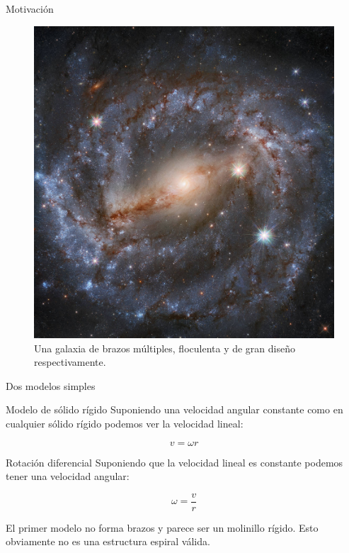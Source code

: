 \documentclass{beamer}
\begin{document}
\begin{frame}{Motivación}
\begin{figure}[h!]
\begin{center}
     \includegraphics[scale=0.04]{granDiseno.jpg}
     \caption{Una galaxia de brazos múltiples, floculenta y de gran diseño respectivamente.}
     \end{center}
\end{figure}
\end{frame}

\begin{frame}{Dos modelos simples}

 \begin{block}{Modelo de sólido rígido}
 Suponiendo una velocidad angular constante como en cualquier sólido rígido podemos ver la velocidad lineal:
 
 $$
 v = \omega r
 $$
 \end{block}
 \begin{block}{Rotación diferencial}
 Suponiendo que la velocidad lineal es constante podemos tener una velocidad angular:
 
 $$
 \omega = \frac{v}{r}
 $$
 \end{block}
 
 El primer modelo no forma brazos y parece ser un molinillo rígido. Esto obviamente no es una estructura espiral válida.

\end{frame}
\end{document}
